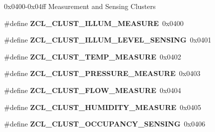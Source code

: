 0x0400-\/0x04ff Measurement and Sensing Clusters \begin{DoxyCompactItemize}
\item 
\hypertarget{group__zcl_gae5d4f50414cbf30d92667430c6a3cfa9}{\#define {\bfseries Z\-C\-L\-\_\-\-C\-L\-U\-S\-T\-\_\-\-I\-L\-L\-U\-M\-\_\-\-M\-E\-A\-S\-U\-R\-E}~0x0400}\label{group__zcl_gae5d4f50414cbf30d92667430c6a3cfa9}

\item 
\hypertarget{group__zcl_ga9959f2e667fb70bfbae24ba82b27efd9}{\#define {\bfseries Z\-C\-L\-\_\-\-C\-L\-U\-S\-T\-\_\-\-I\-L\-L\-U\-M\-\_\-\-L\-E\-V\-E\-L\-\_\-\-S\-E\-N\-S\-I\-N\-G}~0x0401}\label{group__zcl_ga9959f2e667fb70bfbae24ba82b27efd9}

\item 
\hypertarget{group__zcl_gada1c1b659aa1618d26c3a8d35c2f8c7e}{\#define {\bfseries Z\-C\-L\-\_\-\-C\-L\-U\-S\-T\-\_\-\-T\-E\-M\-P\-\_\-\-M\-E\-A\-S\-U\-R\-E}~0x0402}\label{group__zcl_gada1c1b659aa1618d26c3a8d35c2f8c7e}

\item 
\hypertarget{group__zcl_ga415c4708f3e2c1d011a49f47b9f83a23}{\#define {\bfseries Z\-C\-L\-\_\-\-C\-L\-U\-S\-T\-\_\-\-P\-R\-E\-S\-S\-U\-R\-E\-\_\-\-M\-E\-A\-S\-U\-R\-E}~0x0403}\label{group__zcl_ga415c4708f3e2c1d011a49f47b9f83a23}

\item 
\hypertarget{group__zcl_gacd01cad291629fd4727bf9e0c7f894ad}{\#define {\bfseries Z\-C\-L\-\_\-\-C\-L\-U\-S\-T\-\_\-\-F\-L\-O\-W\-\_\-\-M\-E\-A\-S\-U\-R\-E}~0x0404}\label{group__zcl_gacd01cad291629fd4727bf9e0c7f894ad}

\item 
\hypertarget{group__zcl_gae16b40a0813e06d1a730cb82d73bf1ae}{\#define {\bfseries Z\-C\-L\-\_\-\-C\-L\-U\-S\-T\-\_\-\-H\-U\-M\-I\-D\-I\-T\-Y\-\_\-\-M\-E\-A\-S\-U\-R\-E}~0x0405}\label{group__zcl_gae16b40a0813e06d1a730cb82d73bf1ae}

\item 
\hypertarget{group__zcl_gaf9aa3a90bc4b4192d92c37d5ef91b7b7}{\#define {\bfseries Z\-C\-L\-\_\-\-C\-L\-U\-S\-T\-\_\-\-O\-C\-C\-U\-P\-A\-N\-C\-Y\-\_\-\-S\-E\-N\-S\-I\-N\-G}~0x0406}\label{group__zcl_gaf9aa3a90bc4b4192d92c37d5ef91b7b7}

\end{DoxyCompactItemize}
\label{_amgrp01747264fe7bf50731df0522c351974e}%
